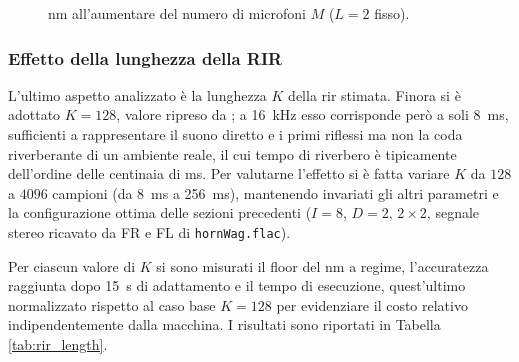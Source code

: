 \documentclass[11pt,a4paper]{article}
\begin{document}
	\begin{figure}[H]
		\centering
		\caption{\ac{nm} all'aumentare del numero di microfoni $M$ ($L = 2$ fisso).}
		\label{fig:nm_m_sweep}
	\end{figure}
	
	\subsubsection{Effetto della lunghezza della RIR}\label{ssec:rir_length}
	L'ultimo aspetto analizzato è la lunghezza $K$ della \ac{rir} stimata. 
	Finora si è adottato $K = 128$, valore ripreso da \cite{11464373}; a \SI{16}{\kilo\hertz} esso corrisponde però a soli \SI{8}{\milli\second}, sufficienti a rappresentare il suono diretto e i primi riflessi ma non la coda riverberante di un ambiente reale, il cui tempo di riverbero è tipicamente dell'ordine delle centinaia di \si{\milli\second}.
	Per valutarne l'effetto si è fatta variare $K$ da $128$ a $4096$ campioni (da \SI{8}{\milli\second} a \SI{256}{\milli\second}), mantenendo invariati gli altri parametri e la configurazione ottima delle sezioni precedenti ($I = 8$, $D = 2$, $2 \times 2$, segnale stereo ricavato da FR e FL di \texttt{hornWag.flac}).
	
	Per ciascun valore di $K$ si sono misurati il floor del \ac{nm} a regime, l'accuratezza raggiunta dopo \SI{15}{\second} di adattamento e il tempo di esecuzione, quest'ultimo normalizzato rispetto al caso base $K = 128$ per evidenziare il costo relativo indipendentemente dalla macchina.
	I risultati sono riportati in Tabella \ref{tab:rir_length}.
	
\end{document}
